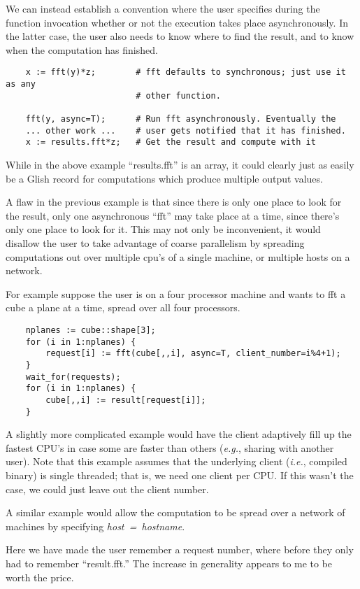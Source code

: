 We can instead establish a convention where the user specifies during
the function invocation whether or not the execution takes place
asynchronously. In the latter case, the user also needs to know where
to find the result, and to know when the computation has finished.

\begin{verbatim}
    x := fft(y)*z;        # fft defaults to synchronous; just use it as any
                          # other function.

    fft(y, async=T);      # Run fft asynchronously. Eventually the
    ... other work ...    # user gets notified that it has finished.
    x := results.fft*z;   # Get the result and compute with it
\end{verbatim}

While in the above example ``results.fft'' is an array, it could
clearly just as easily be a Glish record for computations which
produce multiple output values.

A flaw in the previous example is that since there is only one place to
look for the result, only one asynchronous ``fft'' may take place at a
time, since there's only one place to look for it. This may not only
be inconvenient, it would disallow the user to take advantage of
coarse parallelism by spreading computations out over multiple cpu's
of a single machine, or multiple hosts on a network.

For example suppose the user is on a four processor machine and wants
to fft a cube a plane at a time, spread over all four processors.
\begin{verbatim}
    nplanes := cube::shape[3];
    for (i in 1:nplanes) {
        request[i] := fft(cube[,,i], async=T, client_number=i%4+1);
    }
    wait_for(requests);
    for (i in 1:nplanes) {
        cube[,,i] := result[request[i]];
    }
\end{verbatim}

A slightly more complicated example would have the client adaptively
fill up the fastest CPU's in case some are faster than others
({\em e.g.}, sharing with another user). Note that this example assumes
that the underlying client ({\em i.e.}, compiled binary) is single
threaded; that is, we need one client per CPU. If this wasn't the
case, we could just leave out the client number.

A similar example would allow the computation to be spread over a
network of machines by specifying {\em host~=~hostname}.


Here we have made the user remember a request number, where before
they only had to remember ``result.fft.'' The increase in generality
appears to me to be worth the price.

